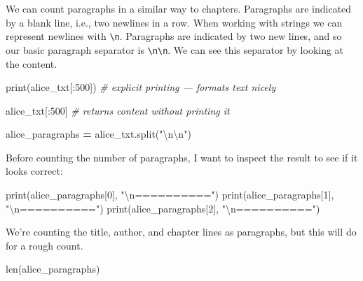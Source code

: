 \documentclass[]{book}
\newenvironment{Shaded}{\begin{snugshade}}{\end{snugshade}}
\newcommand{\DecValTok}[1]{\textcolor[rgb]{0.00,0.00,0.81}{#1}}
\newcommand{\CharTok}[1]{\textcolor[rgb]{0.31,0.60,0.02}{#1}}
\newcommand{\StringTok}[1]{\textcolor[rgb]{0.31,0.60,0.02}{#1}}
\newcommand{\CommentTok}[1]{\textcolor[rgb]{0.56,0.35,0.01}{\textit{#1}}}
\newcommand{\OperatorTok}[1]{\textcolor[rgb]{0.81,0.36,0.00}{\textbf{#1}}}
\newcommand{\BuiltInTok}[1]{#1}
\newcommand{\NormalTok}[1]{#1}
\begin{document}
We can count paragraphs in a similar way to chapters. Paragraphs are
indicated by a blank line, i.e., two newlines in a row. When working
with strings we can represent newlines with \texttt{\textbackslash{}n}.
Paragraphs are indicated by two new lines, and so our basic paragraph
separator is \texttt{\textbackslash{}n\textbackslash{}n}. We can see
this separator by looking at the content.

\begin{Shaded}
\begin{Highlighting}[]
\BuiltInTok{print}\NormalTok{(alice_txt[:}\DecValTok{500}\NormalTok{]) }\CommentTok{# explicit printing --- formats text nicely}

\NormalTok{alice_txt[:}\DecValTok{500}\NormalTok{] }\CommentTok{# returns content without printing it}
\end{Highlighting}
\end{Shaded}

\begin{Shaded}
\begin{Highlighting}[]
\NormalTok{alice_paragraphs }\OperatorTok{=}\NormalTok{ alice_txt.split(}\StringTok{"}\CharTok{\textbackslash{}n\textbackslash{}n}\StringTok{"}\NormalTok{)}
\end{Highlighting}
\end{Shaded}

Before counting the number of paragraphs, I want to inspect the result
to see if it looks correct:

\begin{Shaded}
\begin{Highlighting}[]
\BuiltInTok{print}\NormalTok{(alice_paragraphs[}\DecValTok{0}\NormalTok{], }\StringTok{"}\CharTok{\textbackslash{}n}\StringTok{=========="}\NormalTok{)}
\BuiltInTok{print}\NormalTok{(alice_paragraphs[}\DecValTok{1}\NormalTok{], }\StringTok{"}\CharTok{\textbackslash{}n}\StringTok{=========="}\NormalTok{)}
\BuiltInTok{print}\NormalTok{(alice_paragraphs[}\DecValTok{2}\NormalTok{], }\StringTok{"}\CharTok{\textbackslash{}n}\StringTok{=========="}\NormalTok{)}
\end{Highlighting}
\end{Shaded}

We're counting the title, author, and chapter lines as paragraphs, but
this will do for a rough count.

\begin{Shaded}
\begin{Highlighting}[]
\BuiltInTok{len}\NormalTok{(alice_paragraphs)}
\end{Highlighting}
\end{Shaded}
\end{document}
